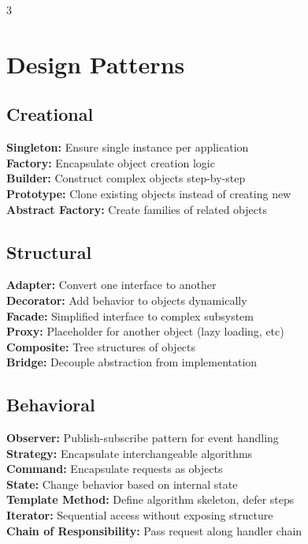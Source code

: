 \documentclass[7pt,landscape]{extarticle}
\begin{document}
\begin{multicols*}{3}
\section*{Design Patterns}

\subsection*{Creational}
\textbf{Singleton:} Ensure single instance per application \\
\textbf{Factory:} Encapsulate object creation logic \\
\textbf{Builder:} Construct complex objects step-by-step \\
\textbf{Prototype:} Clone existing objects instead of creating new \\
\textbf{Abstract Factory:} Create families of related objects

\subsection*{Structural}
\textbf{Adapter:} Convert one interface to another \\
\textbf{Decorator:} Add behavior to objects dynamically \\
\textbf{Facade:} Simplified interface to complex subsystem \\
\textbf{Proxy:} Placeholder for another object (lazy loading, etc) \\
\textbf{Composite:} Tree structures of objects \\
\textbf{Bridge:} Decouple abstraction from implementation

\subsection*{Behavioral}
\textbf{Observer:} Publish-subscribe pattern for event handling \\
\textbf{Strategy:} Encapsulate interchangeable algorithms \\
\textbf{Command:} Encapsulate requests as objects \\
\textbf{State:} Change behavior based on internal state \\
\textbf{Template Method:} Define algorithm skeleton, defer steps \\
\textbf{Iterator:} Sequential access without exposing structure \\
\textbf{Chain of Responsibility:} Pass request along handler chain


\end{multicols*}
\end{document}
